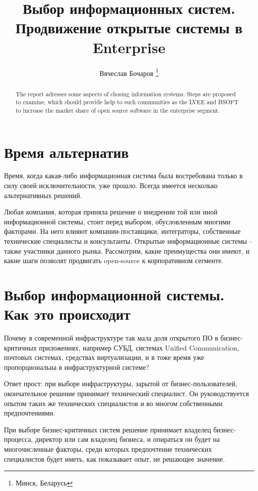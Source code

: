 \documentclass[10pt, a5paper]{article}
\begin{document}
\title{Выбор информационных систем. Продвижение открытые системы в Enterprise}
\author{Вячеслав Бочаров \footnote{Минск, Беларусь}}
\maketitle
\begin{abstract}
The report adresses some aspects of chosing information systems. Steps are proposed to examine, which should provide help to such communities as the LVEE and BSOFT to increase the market share of open source software in the enterprise segment.
\end{abstract}
\section*{Время альтернатив}

Время, когда какая-либо информационная система была востребована только в силу своей исключительности, уже прошло. 
Всегда имеется несколько альтернативных решений.

Любая компания, которая приняла решение о внедрении той или иной информационной системы, стоит перед выбором, обусловленным многими факторами. На него влияют компании-поставщики, интеграторы, собственные технические специалисты и консультанты.
Открытые информационные системы -- также участники данного рынка. Рассмотрим, какие преимущества они имеют, и какие шаги позволят продвигать open-source  к корпоративном сегменте.

\section*{Выбор информационной системы. Как это происходит}

Почему в современной инфраструктуре так мала доля открытого ПО в бизнес-критичных приложениях, например СУБД, системах Unified Communication, почтовых системах, средствах виртуализации, и в тоже время уже пропорциональна в инфраструктурной системе?

Ответ прост: при выборе инфраструктуры, зарытой от бизнес-пользователей, окончательное решение принимает технический специалист. Он руководствуется опытом таких же технических специалистов и во многом собственными предпочтениями.

При выборе бизнес-критичных систем решение принимает владелец бизнес-процесса, директор или сам владелец бизнеса, и опираться он будет на многочисленные факторы, среди которых предпочтение технических специалистов будет иметь, как показывает опыт, не решающее значение.
\end{document}
